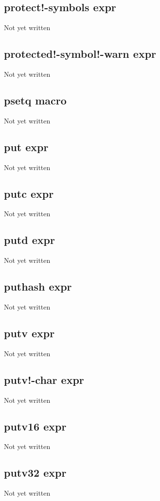 \documentclass[a4paper,11pt]{article}
\begin{document}
{\subsection{\ttfamily protect!-symbols expr}
   Not yet written

\subsection{\ttfamily protected!-symbol!-warn expr}
   Not yet written

\subsection{\ttfamily psetq macro}
   Not yet written

\subsection{\ttfamily put expr}
   Not yet written

\subsection{\ttfamily putc expr}
   Not yet written

\subsection{\ttfamily putd expr}
   Not yet written

\subsection{\ttfamily puthash expr}
   Not yet written

\subsection{\ttfamily putv expr}
   Not yet written

\subsection{\ttfamily putv!-char expr}
   Not yet written

\subsection{\ttfamily putv16 expr}
   Not yet written

\subsection{\ttfamily putv32 expr}
   Not yet written

}
\end{document}
